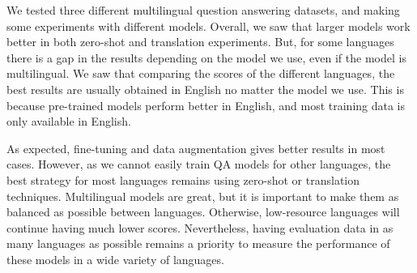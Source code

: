 \documentclass[11pt]{article}
\begin{document}
We tested three different multilingual question answering datasets, and making some experiments with different models. Overall, we saw that larger models work better in both zero-shot and translation experiments. But, for some languages there is a gap in the results depending on the model we use, even if the model is multilingual. We saw that comparing the scores of the different languages, the best results are usually obtained in English no matter the model we use. This is because pre-trained models perform better in English, and most training data is only available in English.

As expected, fine-tuning and data augmentation gives better results in most cases. However, as we cannot easily train QA models for other languages, the best strategy for most languages remains using zero-shot or translation techniques. Multilingual models are great, but it is important to make them as balanced as possible between languages. Otherwise, low-resource languages will continue having much lower scores. Nevertheless, having evaluation data in as many languages as possible remains a priority to measure the performance of these models in a wide variety of languages.



\end{document}
